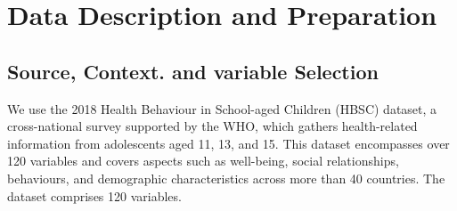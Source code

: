 \documentclass[main.tex]{subfiles}
\begin{document}
\section{Data Description and Preparation}

\subsection{Source, Context. and variable Selection}
We use the 2018 Health Behaviour in School-aged Children (HBSC) dataset, a cross-national survey supported by the WHO, which gathers health-related information from adolescents aged 11, 13, and 15. This dataset encompasses over 120 variables and covers aspects such as well-being, social relationships, behaviours, and demographic characteristics across more than 40 countries. The dataset comprises 120 variables.
\end{document}

